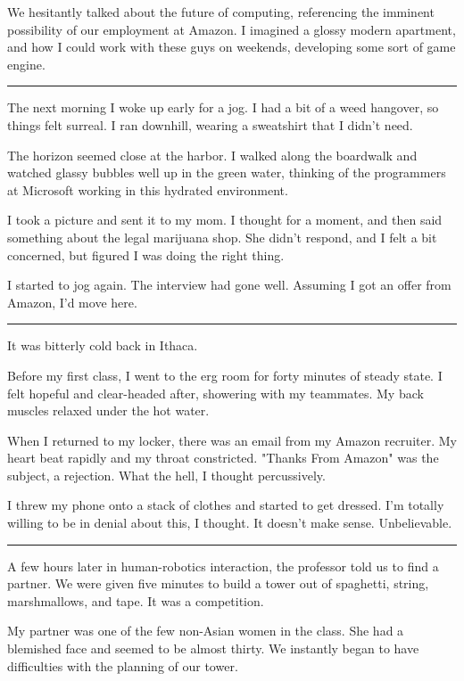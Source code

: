 We hesitantly talked about the future of computing, referencing the imminent
possibility of our employment at Amazon.  I imagined a glossy modern apartment,
and how I could work with these guys on weekends, developing some sort of game
engine.

\plainfancybreak{12pt}{2}{}

The next morning I woke up early for a jog.  I had a bit of a weed hangover, so
things felt surreal.  I ran downhill, wearing a sweatshirt that I didn't need.

The horizon seemed close at the harbor.  I walked along the boardwalk and
watched glassy bubbles well up in the green water, thinking of the programmers
at Microsoft working in this hydrated environment.

I took a picture and sent it to my mom.  I thought for a moment, and then said
something about the legal marijuana shop.  She didn't respond, and I felt a bit
concerned, but figured I was doing the right thing.

I started to jog again.  The interview had gone well.  Assuming I got an offer
from Amazon, I'd move here. 

\plainfancybreak{12pt}{2}{}

It was bitterly cold back in Ithaca.

Before my first class, I went to the erg room for forty minutes of steady state.
I felt hopeful and clear-headed after, showering with my teammates.  My back
muscles relaxed under the hot water.

When I returned to my locker, there was an email from my Amazon recruiter.  My
heart beat rapidly and my throat constricted.  "Thanks From Amazon" was the
subject, a rejection.  What the hell, I thought percussively. 

I threw my phone onto a stack of clothes and started to get dressed.  I'm
totally willing to be in denial about this, I thought.  It doesn't make sense.
Unbelievable. 

\plainfancybreak{12pt}{2}{}

A few hours later in human-robotics interaction, the professor told us to find a
partner.  We were given five minutes to build a tower out of spaghetti, string,
marshmallows, and tape.  It was a competition.

My partner was one of the few non-Asian women in the class.  She had a blemished
face and seemed to be almost thirty.  We instantly began to have difficulties
with the planning of our tower.  

